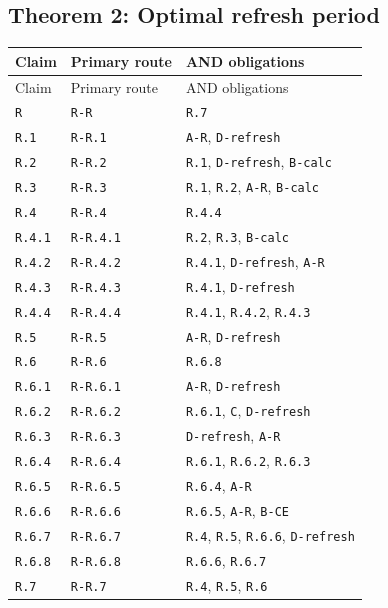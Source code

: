 \documentclass[11pt,letterpaper]{article}
\begin{document}
{\subsection{Theorem 2: Optimal refresh period}
\begin{longtable}{>{\raggedright\arraybackslash}p{.14\linewidth}>{\raggedright\arraybackslash}p{.21\linewidth}>{\raggedright\arraybackslash}p{.54\linewidth}}
\toprule
Claim & Primary route & AND obligations \\
\midrule\endfirsthead
\toprule
Claim & Primary route & AND obligations \\
\midrule\endhead
\bottomrule\endfoot
\texttt{R} & \texttt{R-R} & \texttt{R.7} \\[3pt]
\texttt{R.1} & \texttt{R-R.1} & \texttt{A-R}, \texttt{D-refresh} \\[3pt]
\texttt{R.2} & \texttt{R-R.2} & \texttt{R.1}, \texttt{D-refresh}, \texttt{B-calc} \\[3pt]
\texttt{R.3} & \texttt{R-R.3} & \texttt{R.1}, \texttt{R.2}, \texttt{A-R}, \texttt{B-calc} \\[3pt]
\texttt{R.4} & \texttt{R-R.4} & \texttt{R.4.4} \\[3pt]
\texttt{R.4.1} & \texttt{R-R.4.1} & \texttt{R.2}, \texttt{R.3}, \texttt{B-calc} \\[3pt]
\texttt{R.4.2} & \texttt{R-R.4.2} & \texttt{R.4.1}, \texttt{D-refresh}, \texttt{A-R} \\[3pt]
\texttt{R.4.3} & \texttt{R-R.4.3} & \texttt{R.4.1}, \texttt{D-refresh} \\[3pt]
\texttt{R.4.4} & \texttt{R-R.4.4} & \texttt{R.4.1}, \texttt{R.4.2}, \texttt{R.4.3} \\[3pt]
\texttt{R.5} & \texttt{R-R.5} & \texttt{A-R}, \texttt{D-refresh} \\[3pt]
\texttt{R.6} & \texttt{R-R.6} & \texttt{R.6.8} \\[3pt]
\texttt{R.6.1} & \texttt{R-R.6.1} & \texttt{A-R}, \texttt{D-refresh} \\[3pt]
\texttt{R.6.2} & \texttt{R-R.6.2} & \texttt{R.6.1}, \texttt{C}, \texttt{D-refresh} \\[3pt]
\texttt{R.6.3} & \texttt{R-R.6.3} & \texttt{D-refresh}, \texttt{A-R} \\[3pt]
\texttt{R.6.4} & \texttt{R-R.6.4} & \texttt{R.6.1}, \texttt{R.6.2}, \texttt{R.6.3} \\[3pt]
\texttt{R.6.5} & \texttt{R-R.6.5} & \texttt{R.6.4}, \texttt{A-R} \\[3pt]
\texttt{R.6.6} & \texttt{R-R.6.6} & \texttt{R.6.5}, \texttt{A-R}, \texttt{B-CE} \\[3pt]
\texttt{R.6.7} & \texttt{R-R.6.7} & \texttt{R.4}, \texttt{R.5}, \texttt{R.6.6}, \texttt{D-refresh} \\[3pt]
\texttt{R.6.8} & \texttt{R-R.6.8} & \texttt{R.6.6}, \texttt{R.6.7} \\*[3pt]
\texttt{R.7} & \texttt{R-R.7} & \texttt{R.4}, \texttt{R.5}, \texttt{R.6} \\[3pt]
\end{longtable}}
\end{document}

